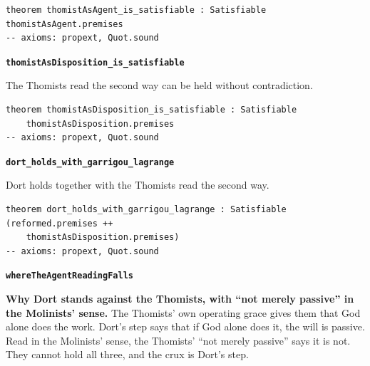 \documentclass[11pt]{article}
\begin{document}
{\small\begin{verbatim}
theorem thomistAsAgent_is_satisfiable : Satisfiable thomistAsAgent.premises
-- axioms: propext, Quot.sound
\end{verbatim}}
\par\medskip\noindent\textbf{\texttt{thomist\allowbreak{}As\allowbreak{}Disposition\_\allowbreak{}is\_\allowbreak{}satisfiable}}\par\nobreak\noindent
The Thomists read the second way can be held without contradiction.

{\small\begin{verbatim}
theorem thomistAsDisposition_is_satisfiable : Satisfiable
    thomistAsDisposition.premises
-- axioms: propext, Quot.sound
\end{verbatim}}
\par\medskip\noindent\textbf{\texttt{dort\_\allowbreak{}holds\_\allowbreak{}with\_\allowbreak{}garrigou\_\allowbreak{}lagrange}}\par\nobreak\noindent
Dort holds together with the Thomists read the second way.

{\small\begin{verbatim}
theorem dort_holds_with_garrigou_lagrange : Satisfiable (reformed.premises ++
    thomistAsDisposition.premises)
-- axioms: propext, Quot.sound
\end{verbatim}}
\par\medskip\noindent\textbf{\texttt{where\allowbreak{}The\allowbreak{}Agent\allowbreak{}Reading\allowbreak{}Falls}}\par\nobreak\noindent
\textbf{Why Dort stands against the Thomists, with “not merely passive” in the Molinists’ sense.} The Thomists’ own operating grace gives them that God alone does the work. Dort’s step says that if God alone does it, the will is passive. Read in the Molinists’ sense, the Thomists’ “not merely passive” says it is not. They cannot hold all three, and the crux is Dort’s step.
\end{document}

